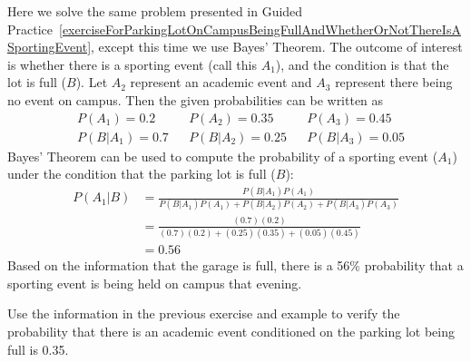 \begin{examplewrap}
\begin{nexample}{Here we solve the same problem presented in Guided Practice~\ref{exerciseForParkingLotOnCampusBeingFullAndWhetherOrNotThereIsASportingEvent}, except this time we use Bayes' Theorem.}
The outcome of interest is whether there is a sporting event (call this $A_1$), and the condition is that the lot is full ($B$). Let $A_2$ represent an academic event and $A_3$ represent there being no event on campus. Then the given probabilities can be written as
\begin{align*}
&P(A_1) = 0.2 &&P(A_2) = 0.35 &&P(A_3) = 0.45 \\
&P(B | A_1) = 0.7 &&P(B | A_2) = 0.25 &&P(B | A_3) = 0.05
\end{align*}
Bayes' Theorem can be used to compute the probability of a sporting event ($A_1$) under the condition that the parking lot is full ($B$):
\begin{align*}
P(A_1 | B) &= \frac{P(B | A_1) P(A_1)}{P(B | A_1) P(A_1) + P(B | A_2) P(A_2) + P(B | A_3) P(A_3)} \\
		&= \frac{(0.7)(0.2)}{(0.7)(0.2) + (0.25)(0.35) + (0.05)(0.45)} \\
		&= 0.56 
\end{align*}
Based on the information that the garage is full, there is a 56\% probability that a sporting event is being held on campus that evening.
\end{nexample}
\end{examplewrap}

\begin{exercisewrap}
\begin{nexercise} \label{exerciseForParkingLotOnCampusBeingFullAndWhetherOrNotThereIsAnAcademicEvent}
Use the information in the previous exercise and example to verify the probability that there is an academic event conditioned on the parking lot being full is 0.35.\footnotemark
\end{nexercise}
\end{exercisewrap}

